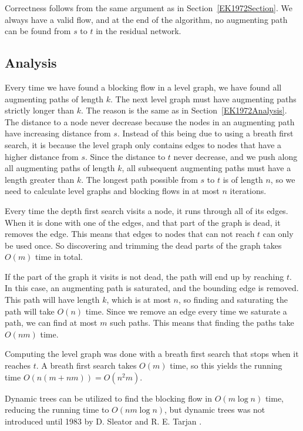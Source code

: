 Correctness follows from the same argument as in Section~\ref{EK1972Section}.
We always have a valid flow, and at the end of the algorithm, no augmenting path can be found from $s$ to $t$ in the residual network.


\subsection{Analysis}

Every time we have found a blocking flow in a level graph, we have found all augmenting paths of length $k$. The next level graph must have augmenting paths strictly longer than $k$.
The reason is the same as in Section~\ref{EK1972Analysis}. The distance to a node never decrease because the nodes in an augmenting path have increasing distance from $s$.
Instead of this being due to using a breath first search, it is because the level graph only contains edges to nodes that have a higher distance from $s$.
Since the distance to $t$ never decrease, and we push along all augmenting paths of length $k$, all subsequent augmenting paths must have a length greater than $k$.
The longest path possible from $s$ to $t$ is of length $n$, so we need to calculate level graphs and blocking flows in at most $n$ iterations. 

Every time the depth first search visits a node, it runs through all of its edges.
When it is done with one of the edges, and that part of the graph is dead, it removes the edge.
This means that edges to nodes that can not reach $t$ can only be used once. So discovering and trimming the dead parts of the graph takes $O(m)$ time in total.

If the part of the graph it visits is not dead, the path will end up by reaching $t$. In this case, an augmenting path is saturated, and the bounding edge is removed.
This path will have length $k$, which is at most $n$, so finding and saturating the path will take $O(n)$ time. 
Since we remove an edge every time we saturate a path, we can find at most $m$ such paths. This means that finding the paths take $O(nm)$ time.

Computing the level graph was done with a breath first search that stops when it reaches $t$.
A breath first search takes $O(m)$ time, so this yields the running time $O\left(n(m+nm)\right)=O(n^2m)$.

Dynamic trees can be utilized to find the blocking flow in $O(m\log n)$ time, reducing the running time to $O(nm\log n)$, 
but dynamic trees was not introduced until 1983 by D. Sleator and R. E. Tarjan \cite{sleator1983}.

